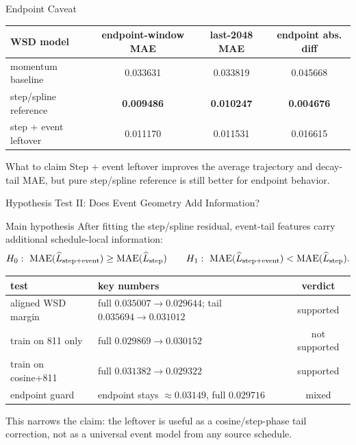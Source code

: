 \documentclass[fontset=fandol,aspectratio=169,10pt]{ctexbeamer}
\newcommand{\mae}{\mathrm{MAE}}
\newcommand{\smallnote}[1]{{\scriptsize\color{tdltGray}#1}}
\begin{document}
\begin{frame}{Endpoint Caveat}
  \begin{table}
    \centering
    \scriptsize
    \begin{tabular}{lccc}
      \toprule
      WSD model & endpoint-window MAE & last-2048 MAE & endpoint abs. diff\\
      \midrule
      momentum baseline & 0.033631 & 0.033819 & 0.045668\\
      step/spline reference & \textbf{0.009486} & \textbf{0.010247} & \textbf{0.004676}\\
      step + event leftover & 0.011170 & 0.011531 & 0.016615\\
      \bottomrule
    \end{tabular}
  \end{table}

  \begin{block}{What to claim}
    Step + event leftover improves the average trajectory and decay-tail MAE, but pure step/spline reference is still better for endpoint behavior.
  \end{block}
\end{frame}

\begin{frame}{Hypothesis Test II: Does Event Geometry Add Information?}
  \begin{block}{Main hypothesis}
    After fitting the step/spline residual, event-tail features carry additional schedule-local information:
    \[
      H_0:\ \mae(\widehat L_{\rm step+event})\ge \mae(\widehat L_{\rm step})
      \qquad
      H_1:\ \mae(\widehat L_{\rm step+event})<\mae(\widehat L_{\rm step}).
    \]
  \end{block}

  \begin{table}
    \centering
    \scriptsize
    \begin{tabular}{p{}p{}c}
      \toprule
      test & key numbers & verdict\\
      \midrule
      aligned WSD margin & full \(0.035007\to0.029644\); tail \(0.035694\to0.031012\) & supported\\
      train on 811 only & full \(0.029869\to0.030152\) & not supported\\
      train on cosine+811 & full \(0.031382\to0.029322\) & supported\\
      endpoint guard & endpoint stays \(\approx0.03149\), full \(0.029716\) & mixed\\
      \bottomrule
    \end{tabular}
  \end{table}
  \smallnote{This narrows the claim: the leftover is useful as a cosine/step-phase tail correction, not as a universal event model from any source schedule.}
\end{frame}
\end{document}
